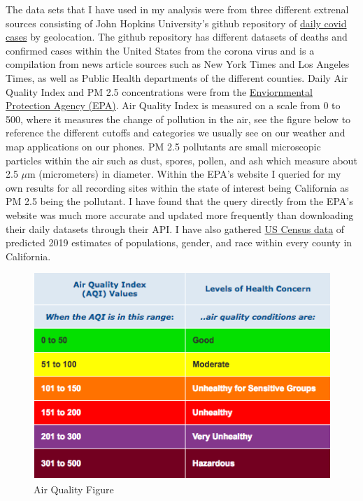 \documentclass[
]{article}
\begin{document}
The data sets that I have used in my analysis were from three different
extrenal sources consisting of John Hopkins University's github
repository of
\href{\%22https://raw.githubusercontent.com/CSSEGISandData/COVID-19/master/csse_covid_19_data/csse_covid_19_time_series/time_series_covid19_confirmed_US.csv\%22}{daily
covid cases} by geolocation. The github repository has different
datasets of deaths and confirmed cases within the United States from the
corona virus and is a compilation from news article sources such as New
York Times and Los Angeles Times, as well as Public Health departments
of the different counties. Daily Air Quality Index and PM 2.5
concentrations were from the
\href{https://www.epa.gov/outdoor-air-quality-data/download-daily-data}{Enviornmental
Protection Agency (EPA)}. Air Quality Index is measured on a scale from
0 to 500, where it measures the change of pollution in the air, see the
figure below to reference the different cutoffs and categories we
usually see on our weather and map applications on our phones. PM 2.5
pollutants are small microscopic particles within the air such as dust,
spores, pollen, and ash which measure about 2.5 \(\mu\)m (micrometers)
in diameter. Within the EPA's website I queried for my own results for
all recording sites within the state of interest being California as PM
2.5 being the pollutant. I have found that the query directly from the
EPA's website was much more accurate and updated more frequently than
downloading their daily datasets through their API. I have also gathered
\href{https://www.census.gov/data/tables/time-series/demo/popest/2010s-counties-detail.html}{US
Census data} of predicted 2019 estimates of populations, gender, and
race within every county in California.

\begin{figure}
\centering
\includegraphics{data/air-quality-alerts.png}
\caption{Air Quality Figure}
\end{figure}
\end{document}
